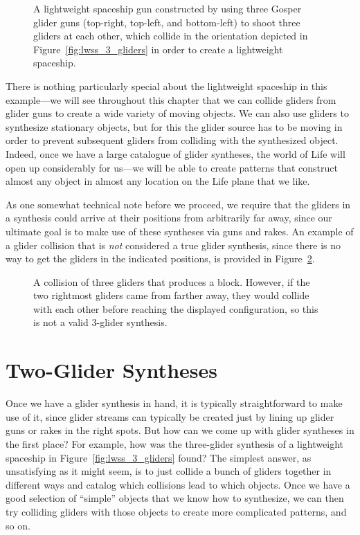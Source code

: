 \begin{figure}[!htb]
	\centering{}
	\caption{A lightweight spaceship gun constructed by using three Gosper glider guns (top-right, top-left, and bottom-left) to shoot three gliders at each other, which collide in the orientation depicted in Figure~\ref{fig:lwss_3_gliders} in order to create a lightweight spaceship.}\label{fig:lwss_gun}
\end{figure}

There is nothing particularly special about the lightweight spaceship in this example---we will see throughout this chapter that we can collide gliders from glider guns to create a wide variety of moving objects. We can also use gliders to synthesize stationary objects, but for this the glider source has to be moving in order to prevent subsequent gliders from colliding with the synthesized object. Indeed, once we have a large catalogue of glider syntheses, the world of Life will open up considerably for us---we will be able to create patterns that construct almost any object in almost any location on the Life plane that we like. 

As one somewhat technical note before we proceed, we require that the gliders in a synthesis could arrive at their positions from arbitrarily far away, since our ultimate goal is to make use of these syntheses via guns and rakes. An example of a glider collision that is \emph{not} considered a true glider synthesis, since there is no way to get the gliders in the indicated positions, is provided in Figure~\ref{fig:invalid_synthesis}.

\begin{figure}[!htb]
	\centering{}
	\caption{A collision of three gliders that produces a block. However, if the two rightmost gliders came from farther away, they would collide with each other before reaching the displayed configuration, so this is not a valid $3$-glider synthesis.}\label{fig:invalid_synthesis}
\end{figure}


\section{Two-Glider Syntheses}\label{sec:2glidersynth}

Once we have a glider synthesis in hand, it is typically straightforward to make use of it, since glider streams can typically be created just by lining up glider guns or rakes in the right spots. But how can we come up with glider syntheses in the first place? For example, how was the three-glider synthesis of a lightweight spaceship in Figure~\ref{fig:lwss_3_gliders} found? The simplest answer, as unsatisfying as it might seem, is to just collide a bunch of gliders together in different ways and catalog which collisions lead to which objects. Once we have a good selection of ``simple'' objects that we know how to synthesize, we can then try colliding gliders with those objects to create more complicated patterns, and so on.

